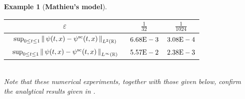 \documentclass[leqno,final]{siamltex}
\makeatletter
\newtheorem{example}{Example}[section]
{\catcode `\@=11 \global\let\AddToReset=\@addtoreset}
\numberwithin{equation}{section}
\newcounter{me}
\makeatother
\begin{document}
\begin{example}[\textbf{Mathieu's model}]
\begin{table}[htbp]
\begin{center}
\begin{tabular}{ccc}\hline
${{\varepsilon }}$ &         ${\frac{{1}}{{32}}}$ & ${\frac{{1}}{{1024}}}$ \\ \hline 
$\begin{array}{c}\vspace{-4mm}\\ {\displaystyle}\sup_{0\le t\le 1}\left\|\, \psi (t,x)
- \psi^{\rm sc} (t,x) \, \right\|_{L^{2}({{\mathbb R}})}\end{array}$ & $6.68{\rm{E}}-3$ &
$3.08{\rm{E}}-4$ \vspace*{0.5mm}\\ \hline $\begin{array}{c}\vspace{-4mm}\\
{\displaystyle}\sup_{0\le t\le 1}\left\|\, \psi (t,x) - \psi^{\rm sc} (t,x)
\, \right\|_{L^{\infty}({{\mathbb R}})}\end{array}$ & $5.57{\rm{E}}-2$ & $2.38{\rm{E}}-3$
\vspace*{0.5mm}\\ \hline
\end{tabular}
\end{center}
\end{table}\\
Note that these numerical experiments, together with those given
below, confirm the analytical results given in \cite{BLP, CMS,
GRT}.
\end{example}
\end{document}
